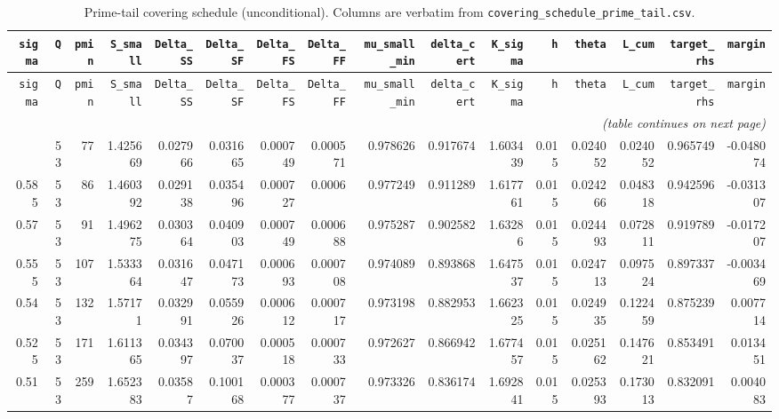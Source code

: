 \begingroup
\setlength{\tabcolsep}{5.5pt}
\renewcommand{\arraystretch}{1.12}
\begin{longtable}{rrrrrrrrrrrrrrrr}
\caption{Prime-tail covering schedule (unconditional). Columns are verbatim from \texttt{covering\_schedule\_prime\_tail.csv}.}\\
\toprule
\texttt{sigma} & \texttt{Q} & \texttt{pmin} & \texttt{S\_small} & \texttt{Delta\_SS} & \texttt{Delta\_SF} & \texttt{Delta\_FS} & \texttt{Delta\_FF} & \texttt{mu\_small\_min} & \texttt{delta\_cert} & \texttt{K\_sigma} & \texttt{h} & \texttt{theta} & \texttt{L\_cum} & \texttt{target\_rhs} & \texttt{margin} \\
\midrule
\endfirsthead
\toprule
\texttt{sigma} & \texttt{Q} & \texttt{pmin} & \texttt{S\_small} & \texttt{Delta\_SS} & \texttt{Delta\_SF} & \texttt{Delta\_FS} & \texttt{Delta\_FF} & \texttt{mu\_small\_min} & \texttt{delta\_cert} & \texttt{K\_sigma} & \texttt{h} & \texttt{theta} & \texttt{L\_cum} & \texttt{target\_rhs} & \texttt{margin} \\
\midrule
\endhead
\midrule
\multicolumn{16}{r}{\emph{(table continues on next page)}} \\
\bottomrule
\endfoot
\bottomrule
\endlastfoot
0.6 & 53 & 77 & 1.425669 & 0.027966 & 0.031665 & 0.000749 & 0.000571 & 0.978626 & 0.917674 & 1.603439 & 0.015 & 0.024052 & 0.024052 & 0.965749 & -0.048074 \\
0.585 & 53 & 86 & 1.460392 & 0.029138 & 0.035496 & 0.000727 & 0.0006 & 0.977249 & 0.911289 & 1.617761 & 0.015 & 0.024266 & 0.048318 & 0.942596 & -0.031307 \\
0.57 & 53 & 91 & 1.496275 & 0.030364 & 0.040903 & 0.000749 & 0.000688 & 0.975287 & 0.902582 & 1.63286 & 0.015 & 0.024493 & 0.072811 & 0.919789 & -0.017207 \\
0.555 & 53 & 107 & 1.533364 & 0.031647 & 0.047173 & 0.000693 & 0.000708 & 0.974089 & 0.893868 & 1.647537 & 0.015 & 0.024713 & 0.097524 & 0.897337 & -0.003469 \\
0.54 & 53 & 132 & 1.57171 & 0.032991 & 0.055926 & 0.000612 & 0.000717 & 0.973198 & 0.882953 & 1.662325 & 0.015 & 0.024935 & 0.122459 & 0.875239 & 0.007714 \\
0.525 & 53 & 171 & 1.611365 & 0.034397 & 0.070037 & 0.000518 & 0.000733 & 0.972627 & 0.866942 & 1.677457 & 0.015 & 0.025162 & 0.147621 & 0.853491 & 0.013451 \\
0.51 & 53 & 259 & 1.652383 & 0.03587 & 0.100168 & 0.000377 & 0.000737 & 0.973326 & 0.836174 & 1.692841 & 0.015 & 0.025393 & 0.173013 & 0.832091 & 0.004083 \\
\end{longtable}
\endgroup
